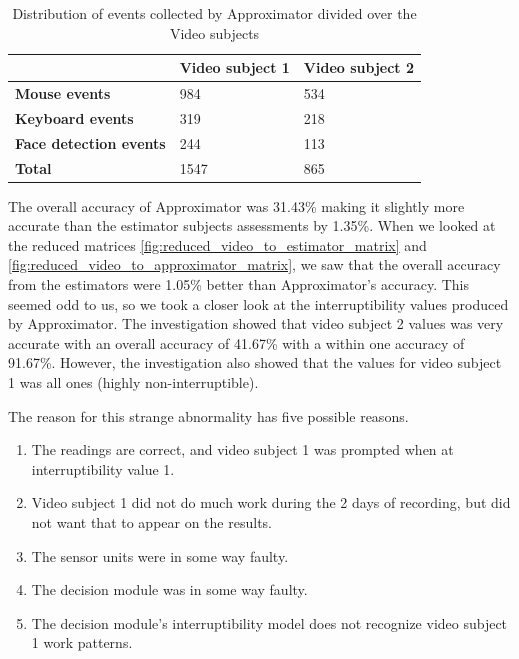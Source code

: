 \documentclass{sigchi}
\begin{document}
\begin{table}[h]
  \centering
  \begin{tabular}{@{}lll@{}}
    \toprule
     & \textbf{Video subject 1} & \textbf{Video subject 2}\\ \midrule
    \textbf{Mouse events}       & 984    & 534    \\
    \textbf{Keyboard events}       & 319    & 218    \\
    \textbf{Face detection events}       & 244    & 113    \\ \midrule
    \textbf{Total}   & 1547 & 865\\ \bottomrule
  \end{tabular}
  \caption{Distribution of events collected by Approximator divided over the Video subjects}
  \label{tab:event_distribution}
\end{table}

The overall accuracy of Approximator was 31.43\% making it slightly more accurate than the estimator subjects assessments by 1.35\%.
When we looked at the reduced matrices \autoref{fig:reduced_video_to_estimator_matrix} and \autoref{fig:reduced_video_to_approximator_matrix}, we saw that the overall accuracy from the estimators were 1.05\% better than Approximator's accuracy.
This seemed odd to us, so we took a closer look at the interruptibility values produced by Approximator.
The investigation showed that video subject 2 values was very accurate with an overall accuracy of 41.67\% with a within one accuracy of 91.67\%.
However, the investigation also showed that the values for video subject 1 was all ones (highly non-interruptible).

The reason for this strange abnormality has five possible reasons.
\begin{enumerate}[noitemsep]
  \item The readings are correct, and video subject 1 was prompted when at interruptibility value 1.
  \item Video subject 1 did not do much work during the 2 days of recording, but did not want that to appear on the results.
  \item The sensor units were in some way faulty.
  \item The decision module was in some way faulty.
  \item The decision module's interruptibility model does not recognize video subject 1 work patterns.
\end{enumerate}
\end{document}
